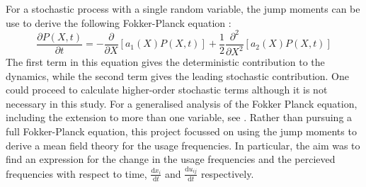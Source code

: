\documentclass[12pt]{article}
\begin{document}
For a stochastic process with a single random variable, the jump moments can be use to derive the following Fokker-Planck equation \cite{fpeqn}:
\begin{equation}\label{fp}
\frac{\partial P (X,t)}{\partial t} = - \frac{\partial}{\partial X} \left[ a_1(X)P(X,t) \right] + \frac{1}{2}\frac{\partial^2}{\partial X^2} \left[ a_2(X)P(X,t) \right]
\end{equation}
The first term in this equation gives the deterministic contribution to the dynamics, while the second term gives the leading stochastic contribution. One could proceed to calculate higher-order stochastic terms although it is not necessary in this study. For a generalised analysis of the Fokker Planck equation, including the extension to more than one variable, see \cite{fpeqn}. Rather than pursuing a full Fokker-Planck equation, this project focussed on using the jump moments to derive a mean field theory for the usage frequencies. In particular, the aim was to find an expression for the change in the usage frequencies and the percieved frequencies with respect to time, $\frac{\mathrm d x_i}{\mathrm d t}$ and $\frac{\mathrm d u_{ij}}{\mathrm d t}$ respectively.
\end{document}
